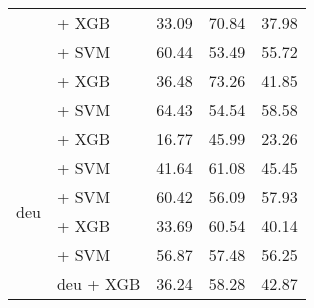 \begin{table*}[ht]
\begin{tabular}{@{}llp{1.1cm}p{1.1cm}p{1.1cm}@{}}
                                           & \citep{lier0072023xiaobuembeddingv2} + XGB                         & 33.09                           & 70.84                              & 37.98                             \\
                                           & \citep{lier0072023xiaobuembeddingv2} + SVM                         & 60.44                           & 53.49                              & 55.72                             \\
                                           & \citep{zpoint-large-embedding-zh} + XGB                            & 36.48                           & 73.26                              & 41.85                             \\
                                           & \citep{zpoint-large-embedding-zh} + SVM                            & 64.43                           & 54.54                              & 58.58                             \\
        \midrule
        \multirow{11}{*}{deu}              & \citep{all-MiniLM-L12-v2}  + XGB                                   & 16.77                           & 45.99                              & 23.26                             \\
                                           & \citep{heinz2023e5basestsende} + SVM                               & 41.64                           & 61.08                              & 45.45                             \\
                                           & \citep{wang2024multilingual} + SVM                                 & 60.42                           & 56.09                              & 57.93                             \\
                                           & \citep{chan2020germanslanguagemodel} + XGB                         & 33.69                           & 60.54                              & 40.14                             \\
                                           & \citep{chibb2023germansemanticsts} + SVM                           & 56.87                           & 57.48                              & 56.25                             \\
                                           & \citep{mohr2024multi} deu + XGB                                    & 36.24                           & 58.28                              & 42.87                             \\

\end{tabular}
\end{table*}
